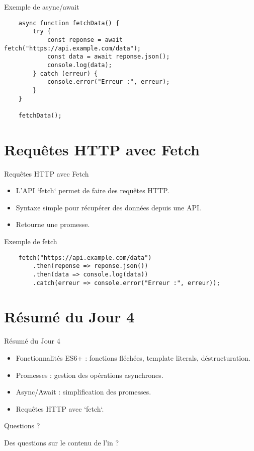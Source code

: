 \documentclass{beamer}
\begin{document}
    \begin{frame}[fragile]{Exemple de async/await}
    \begin{verbatim}
    async function fetchData() {
        try {
            const reponse = await fetch("https://api.example.com/data");
            const data = await reponse.json();
            console.log(data);
        } catch (erreur) {
            console.error("Erreur :", erreur);
        }
    }
    
    fetchData();
    \end{verbatim}
    \end{frame}
    
    \section{Requêtes HTTP avec Fetch}
    \begin{frame}{Requêtes HTTP avec Fetch}
    \begin{itemize}
        \item L'API `fetch` permet de faire des requêtes HTTP.
        \item Syntaxe simple pour récupérer des données depuis une API.
        \item Retourne une promesse.
    \end{itemize}
    \end{frame}
    
    \begin{frame}[fragile]{Exemple de fetch}
    \begin{verbatim}
    fetch("https://api.example.com/data")
        .then(reponse => reponse.json())
        .then(data => console.log(data))
        .catch(erreur => console.error("Erreur :", erreur));
    \end{verbatim}
    \end{frame}
    
    \section{Résumé du Jour 4}
    \begin{frame}{Résumé du Jour 4}
    \begin{itemize}
        \item Fonctionnalités ES6+ : fonctions fléchées, template literals, déstructuration.
        \item Promesses : gestion des opérations asynchrones.
        \item Async/Await : simplification des promesses.
        \item Requêtes HTTP avec `fetch`.
    \end{itemize}
    \end{frame}
    
    \begin{frame}{Questions ?}
    \begin{center}
    \Large Des questions sur le contenu de l'in ?
    \end{center}
    \end{frame}
    
\end{document}
